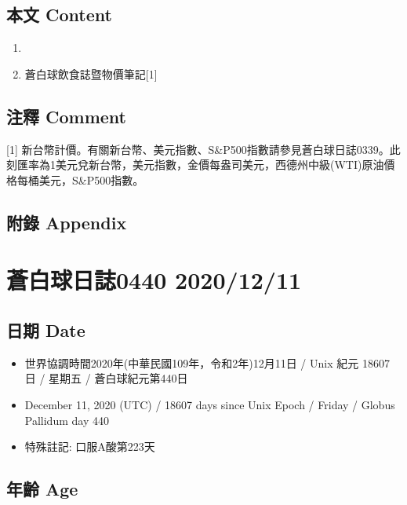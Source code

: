 \documentclass[a5paper, 10pt
]{book}
\providecommand{\tightlist}{%
  \setlength{\itemsep}{0pt}\setlength{\parskip}{0pt}}
\begin{document}
\hypertarget{ux672cux6587-content-9}{%
\subsection{本文 Content}\label{ux672cux6587-content-9}}

\begin{enumerate}
\def\labelenumi{\arabic{enumi}.}
\tightlist
\item
\item
  蒼白球飲食誌暨物價筆記{[}1{]}
\end{enumerate}

\hypertarget{ux6ce8ux91cb-comment-9}{%
\subsection{注釋 Comment}\label{ux6ce8ux91cb-comment-9}}

{[}1{]}
新台幣計價。有關新台幣、美元指數、S\&P500指數請參見蒼白球日誌0339。此刻匯率為1美元兌新台幣，美元指數，金價每盎司美元，西德州中級(WTI)原油價格每桶美元，S\&P500指數。

\hypertarget{ux9644ux9304-appendix-9}{%
\subsection{附錄 Appendix}\label{ux9644ux9304-appendix-9}}

\hypertarget{ux84bcux767dux7403ux65e5ux8a8c0440-20201211}{%
\section{蒼白球日誌0440
2020/12/11}\label{ux84bcux767dux7403ux65e5ux8a8c0440-20201211}}

\hypertarget{ux65e5ux671f-date-10}{%
\subsection{日期 Date}\label{ux65e5ux671f-date-10}}

\begin{itemize}
\tightlist
\item
  世界協調時間2020年(中華民國109年，令和2年)12月11日 / Unix 紀元 18607
  日 / 星期五 / 蒼白球紀元第440日
\item
  December 11, 2020 (UTC) / 18607 days since Unix Epoch / Friday /
  Globus Pallidum day 440
\item
  特殊註記: 口服A酸第223天
\end{itemize}

\hypertarget{ux5e74ux9f61-age-10}{%
\subsection{年齡 Age}\label{ux5e74ux9f61-age-10}}
\end{document}
